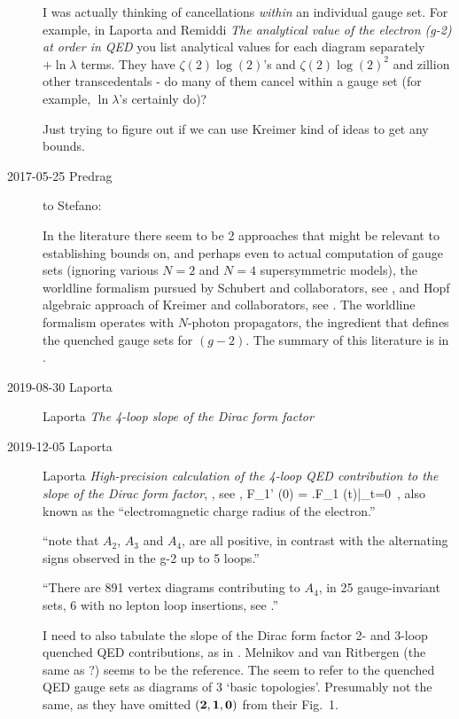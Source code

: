 \begin{description}
I was actually thinking of cancellations \emph{within} an individual
gauge set.  For example, in
Laporta and Remiddi
{\em The analytical value of the electron (g-2) at order in QED}
you list analytical values for each diagram separately $+\ln\lambda$
terms. They have $\zeta(2)\log(2)$'s and $\zeta(2)\log(2)^2$ and zillion
other transcedentals - do many of them cancel within a gauge set (for
example, $\ln\lambda$'s certainly do)?

Just trying to figure out if we can use Kreimer kind of ideas to get any
bounds.

\item[2017-05-25 Predrag] to Stefano:

In the literature there seem to be 2 approaches that might be relevant to
establishing bounds on, and perhaps even to actual computation of
gauge sets
(ignoring various $N=2$ and $N=4$ supersymmetric models),
the worldline formalism pursued by Schubert and
collaborators, see ,
and Hopf algebraic approach of Kreimer and
collaborators, see .
The worldline formalism operates with $N$-photon propagators, the ingredient
that defines the quenched gauge sets for $(g-2)$. The summary
of this literature is in .




\item[2019-08-30 Laporta]
Laporta
{\em The 4-loop slope of the {Dirac} form factor}

\item[2019-12-05 Laporta] Laporta {\em High-precision
calculation of the 4-loop {QED} contribution to the slope of the {Dirac}
form factor}, , see ,
\beq
F_1' (0) = \left.F_1 (t)\right|_{t=0}
\,,
\label{DiracSlope}
\eeq
also known as the ``electromagnetic charge radius of the electron.''

``note that $A_2$, $A_3$ and $A_4$, are all positive, in contrast with
the alternating signs observed in the g-2 up to 5 loops.''

``There are 891 vertex diagrams contributing to  $A_4$,
in 25 gauge-invariant sets, 6 with no lepton loop insertions, see
.''

I need to also tabulate the slope of the {Dirac} form factor 2- and
3-loop quenched QED contributions, as in . Melnikov
and van Ritbergen (the same as ?) seems to be
the reference. The seem to refer to the  quenched QED gauge sets as
diagrams of 3 `basic topologies'. Presumably not the same, as they have
omitted $\bf (2,1,0)$ from their Fig.~1.


\end{description}
